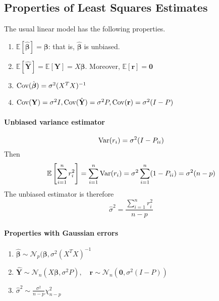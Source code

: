  
 
\subsection{Properties of Least Squares Estimates}
\begin{theory}
 The usual linear model has the following properties.
 \begin{enumerate}
  \item $\mathbb{E}[\hat{\boldsymbol{\beta}}] = \boldsymbol{\beta}$: that is, $\hat{\boldsymbol{\beta}}$ is unbiased.
  \item $\mathbb{E}[\hat{\mathbf{Y}}] = \mathbb{E}[\mathbf{Y}] = X \boldsymbol{\beta}$. Moreover, $\mathbb{E}[\mathbf{r}] = \mathbf{0}$
  \item $\operatorname{Cov}(\hat{\boldsymbol{\beta}}) = \sigma^2(X^TX)^{-1}$
  \item $\operatorname{Cov}(\mathbf{Y}) = \sigma^2 I, \operatorname{Cov}(\hat{\mathbf{Y}}) = \sigma^2 P, \operatorname{Cov}(\mathbf{r}) = \sigma^2(I-P)$
 \end{enumerate}

 \paragraph{Unbiased variance estimator}
 \begin{equation*}
  \operatorname{Var}(r_i) = \sigma^2(I-P_{ii})
 \end{equation*}
 Then
 \begin{equation*}
  \mathbb{E}\left[ \sum_{i=1}^n r_i^2 \right] = \sum_{i=1}^n \operatorname{Var}(r_i) = \sigma^2 \sum_{i=1}^n (1-P_{ii}) = \sigma^2(n-p)
 \end{equation*}
 The unbiased estimator is therefore
 \begin{equation*}
  \hat{\sigma}^2 = \frac{\sum_{i=1}^n r_i^2}{n-p}
 \end{equation*}

 \paragraph{Properties with Gaussian errors}
 \begin{enumerate}
  \item $\hat{\boldsymbol{\beta}} \sim \mathcal{N}_p(\boldsymbol{\beta}, \sigma^2 (X^TX)^{-1}$
  \item $\hat{\mathbf{Y}} \sim \mathcal{N}_n (X\boldsymbol{\beta}, \sigma^2 P),\quad \mathbf{r}\sim \mathcal{N}_n(\mathbf{0}, \sigma^2 (I-P))$
  \item $\hat{\sigma}^2 \sim \frac{\sigma^2}{n-p} \chi^2_{n-p}$
 \end{enumerate}
\end{theory}

